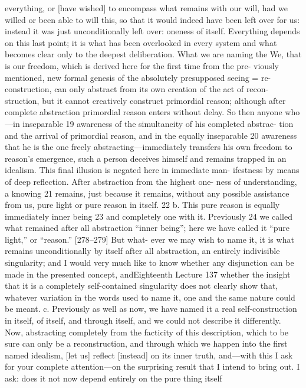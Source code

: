 everything, or [have wished] to encompass what remains with our will, had we
willed or been able to will this, so that it would indeed have been left over for
us: instead it was just unconditionally left over: oneness of itself. Everything
depends on this last point; it is what has been overlooked in every system and
what becomes clear only to the deepest deliberation. What we are naming the
We, that is our freedom, which is derived here for the first time from the pre-
viously mentioned, new formal genesis of the absolutely presupposed seeing =
re-construction, can only abstract from its own creation of the act of recon-
struction, but it cannot creatively construct primordial reason; although after
complete abstraction primordial reason enters without delay. So then anyone
who—in inseparable 19 awareness of the simultaneity of his completed abstrac-
tion and the arrival of primordial reason, and in the equally inseparable 20
awareness that he is the one freely abstracting—immediately transfers his own
freedom to reason’s emergence, such a person deceives himself and remains
trapped in an idealism. This final illusion is negated here in immediate man-
ifestness by means of deep reflection. After abstraction from the highest one-
ness of understanding, a knowing 21 remains, just because it remains, without
any possible assistance from us, pure light or pure reason in itself. 22
b. This pure reason is equally immediately inner being 23 and completely
one with it. Previously 24 we called what remained after all abstraction “inner
being”; here we have called it “pure light,” or “reason.” [278–279] But what-
ever we may wish to name it, it is what remains unconditionally by itself after
all abstraction, an entirely indivisible singularity; and I would very much like
to know whether any disjunction can be made in the presented concept, andEighteenth Lecture
137
whether the insight that it is a completely self-contained singularity does not
clearly show that, whatever variation in the words used to name it, one and
the same nature could be meant.
c. Previously as well as now, we have named it a real self-construction in
itself, of itself, and through itself, and we could not describe it differently. Now,
abstracting completely from the facticity of this description, which to be sure
can only be a reconstruction, and through which we happen into the first
named idealism, [let us] reflect [instead] on its inner truth, and—with this I
ask for your complete attention—on the surprising result that I intend to
bring out. I ask: does it not now depend entirely on the pure thing itself

